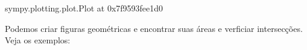 \documentclass[letterpaper,10pt,english]{jupyterBook}
\begin{document}
\begin{sphinxVerbatim}[commandchars=\\\{\}]
\end{sphinxVerbatim}

\noindent{}

\begin{sphinxVerbatim}[commandchars=\\\{\}]
\PYGZlt{}sympy.plotting.plot.Plot at 0x7f9593fee1d0\PYGZgt{}
\end{sphinxVerbatim}

\sphinxAtStartPar
Podemos criar figuras geométricas e encontrar suas áreas e verficiar intersecções. Veja os exemplos:
\end{document}
